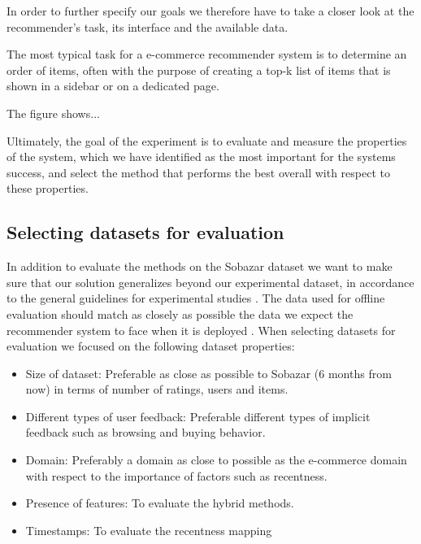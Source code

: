 
In order to further specify our goals we therefore have to take a closer look at the recommender's task,
its interface and the available data.

The most typical task for a e-commerce recommender system is to determine an order of items,
often with the purpose of creating a top-k list of items that is shown in a sidebar or on a
dedicated page.


The figure shows...


Ultimately, the goal of the experiment is to evaluate and measure the properties
of the system, which we have identified as the most important for the systems success,
and select the method that performs the best overall with respect to these properties.

\subsection{Selecting datasets for evaluation}

In addition to evaluate the methods on the Sobazar dataset we want to make sure that our
solution generalizes beyond our experimental dataset, in accordance to the general guidelines
for experimental studies \cite{Shani2011}. The data used for offline evaluation should match
as closely as possible the data we expect the recommender system to face when it is
deployed \cite{Gunawardana2009}. When selecting datasets for evaluation we focused on the
following dataset properties:

\begin{itemize}
	\item Size of dataset: Preferable as close as possible to Sobazar (6 months from now)
	in terms of number of ratings, users and items.

	\item Different types of user feedback: Preferable different types of implicit feedback
	such as browsing and buying behavior.

	\item Domain: Preferably a domain as close to possible as the e-commerce domain with respect
	to the importance of factors such as recentness.

	\item Presence of features: To evaluate the hybrid methods.

	\item Timestamps: To evaluate the recentness mapping
\end{itemize}

